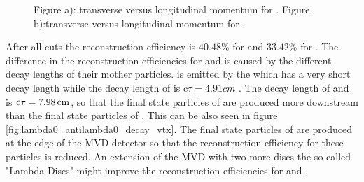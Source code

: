 		\begin{figure}
			
			\caption{\propose Figure a): transverse versus longitudinal momentum for \lam. Figure b):transverse versus longitudinal momentum for \alam.}
			\label{fig:lambda0_pt_vs_pz}
		
		\end{figure}
		After all cuts the reconstruction efficiency is $40.48\%$ for \lam and $33.42\%$ for \alam.
		The difference in the reconstruction efficiencies for \lam and \alam is caused by the different decay lengths of their mother particles.
		\lam is emitted by the \excitedcascade which has a very short decay length while the decay length of \anticascade is 
		c$\tau = 4.91 \unit{cm}$ \cite{PDG}.
		The decay length of \lam and \alam is $\textnormal{c}\tau = 7.98 \, \textnormal{cm}$, so that the final state particles of \alam are produced more downstream 
		than the final state particles of \lam.
		This can be also seen in figure \ref{fig:lambda0_antilambda0_decay_vtx}.
		The final state particles of \alam are produced at the edge of the MVD detector so that the reconstruction efficiency for these particles is reduced.
		An extension of the MVD with two more discs the so-called "Lambda-Discs" might improve the reconstruction efficiencies for \lam and \alam.
		
